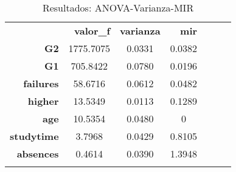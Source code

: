 \documentclass{article}
\begin{document}
\begin{itemize}[label=\textendash]
\begin{table}[H]
\centering
\begin{tabular}{rccclll}
\textbf{}                                  & \multicolumn{1}{r}{\cellcolor[HTML]{DAE8FC}\textbf{valor\_f}} & \multicolumn{1}{r}{\cellcolor[HTML]{DAE8FC}\textbf{varianza}} & \multicolumn{1}{r}{\cellcolor[HTML]{DAE8FC}\textbf{mir}} &  &  &  \\ \cline{1-4}
\textbf{G2}                                & 1775.7075                                                     & 0.0331                                                        & 0.0382                                                   &  &  &  \\
\cellcolor[HTML]{EFEFEF}\textbf{G1}        & \cellcolor[HTML]{EFEFEF}705.8422                              & \cellcolor[HTML]{EFEFEF}0.0780                                & \cellcolor[HTML]{EFEFEF}0.0196                           &  &  &  \\
\textbf{failures}                          & 58.6716                                                       & 0.0612                                                        & 0.0482                                                   &  &  &  \\
\cellcolor[HTML]{EFEFEF}\textbf{higher}    & \cellcolor[HTML]{EFEFEF}13.5349                               & \cellcolor[HTML]{EFEFEF}0.0113                                & \cellcolor[HTML]{EFEFEF}0.1289                           &  &  &  \\
\textbf{age}                               & 10.5354                                                       & 0.0480                                                        & 0                                                        &  &  &  \\
\cellcolor[HTML]{EFEFEF}\textbf{studytime} & \cellcolor[HTML]{EFEFEF}3.7968                                & \cellcolor[HTML]{EFEFEF}0.0429                                & \cellcolor[HTML]{EFEFEF}0.8105                           &  &  &  \\
\textbf{absences}                          & 0.4614                                                        & 0.0390                                                        & 1.3948                                                   &  &  &  \\
\multicolumn{1}{l}{}                       & \multicolumn{1}{l}{}                                          & \multicolumn{1}{l}{}                                          & \multicolumn{1}{l}{}                                     &  &  & 
\end{tabular}
\caption{Resultados: ANOVA-Varianza-MIR}
\label{tab:VALOR F-VAR}
\end{table}



\end{itemize}
\end{document}
